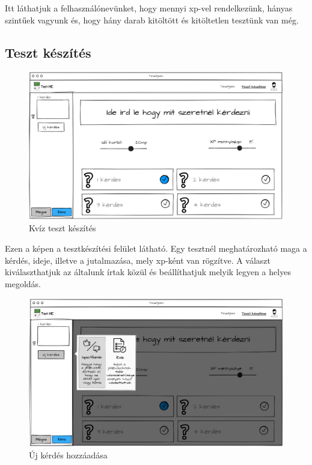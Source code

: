 Itt láthatjuk  a felhasználónevünket, hogy mennyi xp-vel rendelkezünk, hányas szintűek vagyunk és, hogy hány darab kitöltött és kitöltetlen tesztünk van még.

\subsection{Teszt készítés}

\begin{figure}[H]
    \centering
    \includegraphics[width=\linewidth]{images/make_test_wireframe.png}
    \caption{Kvíz teszt készítés}
    \label{fig:new_quiz_question}
\end{figure}

Ezen a képen  a tesztkészítési felület látható. Egy tesztnél meghatározható maga a kérdés, ideje, illetve a jutalmazása, mely xp-ként van rögzítve. A választ kiválaszthatjuk az általunk írtak közül és beállíthatjuk melyik legyen a helyes megoldás.

\begin{figure}[H]
    \centering
    \includegraphics[width=\linewidth]{images/make_test2_wireframe.png}
    \caption{Új kérdés hozzáadása}
    \label{fig:new_question}
\end{figure}

